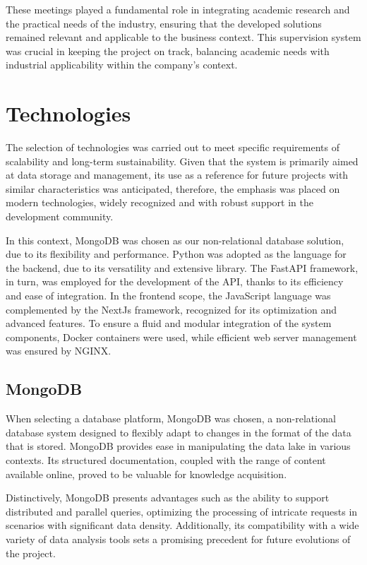 These meetings played a fundamental role in integrating academic research and the practical needs of the industry, ensuring that the developed solutions remained relevant and applicable to the business context. This supervision system was crucial in keeping the project on track, balancing academic needs with industrial applicability within the company's context.

\section[Tecnologias]{Technologies}
The selection of technologies was carried out to meet specific requirements of scalability and long-term sustainability. Given that the system is primarily aimed at data storage and management, its use as a reference for future projects with similar characteristics was anticipated, therefore, the emphasis was placed on modern technologies, widely recognized and with robust support in the development community.

In this context, MongoDB was chosen as our non-relational database solution, due to its flexibility and performance. Python was adopted as the language for the backend, due to its versatility and extensive library. The FastAPI framework, in turn, was employed for the development of the \gls{API}, thanks to its efficiency and ease of integration. In the frontend scope, the JavaScript language was complemented by the NextJs framework, recognized for its optimization and advanced features. To ensure a fluid and modular integration of the system components, Docker containers were used, while efficient web server management was ensured by NGINX.

\subsection{MongoDB}

When selecting a database platform, MongoDB \cite{mongodbDocs} was chosen, a non-relational database system designed to flexibly adapt to changes in the format of the data that is stored. MongoDB provides ease in manipulating the data lake in various contexts. Its structured documentation, coupled with the range of content available online, proved to be valuable for knowledge acquisition.

Distinctively, MongoDB presents advantages such as the ability to support distributed and parallel queries, optimizing the processing of intricate requests in scenarios with significant data density. Additionally, its compatibility with a wide variety of data analysis tools sets a promising precedent for future evolutions of the project.

